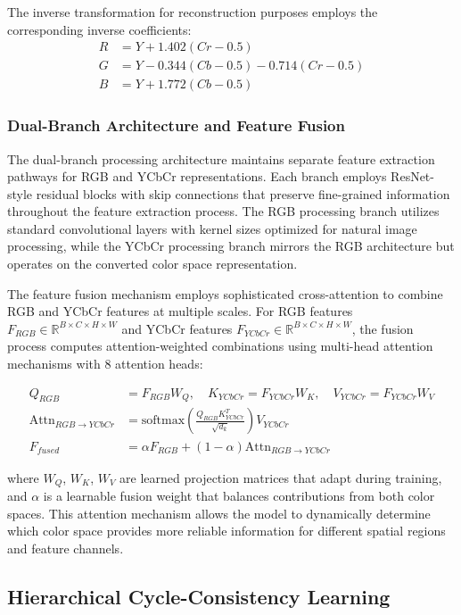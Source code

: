 \documentclass{article}
\begin{document}
The inverse transformation for reconstruction purposes employs the corresponding inverse coefficients:
\begin{align}
R &= Y + 1.402(Cr - 0.5) \\
G &= Y - 0.344(Cb - 0.5) - 0.714(Cr - 0.5) \\
B &= Y + 1.772(Cb - 0.5)
\end{align}

\subsubsection{Dual-Branch Architecture and Feature Fusion}

The dual-branch processing architecture maintains separate feature extraction pathways for RGB and YCbCr representations. Each branch employs ResNet-style residual blocks with skip connections that preserve fine-grained information throughout the feature extraction process. The RGB processing branch utilizes standard convolutional layers with kernel sizes optimized for natural image processing, while the YCbCr processing branch mirrors the RGB architecture but operates on the converted color space representation.

The feature fusion mechanism employs sophisticated cross-attention to combine RGB and YCbCr features at multiple scales. For RGB features $F_{RGB} \in \mathbb{R}^{B \times C \times H \times W}$ and YCbCr features $F_{YCbCr} \in \mathbb{R}^{B \times C \times H \times W}$, the fusion process computes attention-weighted combinations using multi-head attention mechanisms with 8 attention heads:

\begin{align}
Q_{RGB} &= F_{RGB}W_Q, \quad K_{YCbCr} = F_{YCbCr}W_K, \quad V_{YCbCr} = F_{YCbCr}W_V \\
\text{Attn}_{RGB \rightarrow YCbCr} &= \text{softmax}\left(\frac{Q_{RGB}K_{YCbCr}^T}{\sqrt{d_k}}\right)V_{YCbCr} \\
F_{fused} &= \alpha F_{RGB} + (1-\alpha) \text{Attn}_{RGB \rightarrow YCbCr}
\end{align}

where $W_Q$, $W_K$, $W_V$ are learned projection matrices that adapt during training, and $\alpha$ is a learnable fusion weight that balances contributions from both color spaces. This attention mechanism allows the model to dynamically determine which color space provides more reliable information for different spatial regions and feature channels.

\subsection{Hierarchical Cycle-Consistency Learning}
\end{document}
